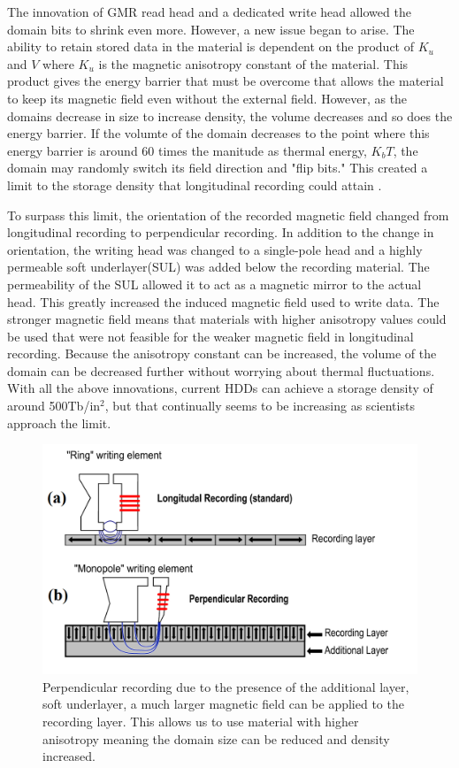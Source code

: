 \documentclass[ notitlepage, numerical, 11pt]{revtex4-1} %
\begin{document}
The innovation of GMR read head and a dedicated write head allowed the domain bits to shrink even more. However, a new issue began to arise. The ability to retain stored data in the material is dependent on the product of $K_u$ and $V$ where $K_u$ is the magnetic anisotropy constant of the material. This product gives the energy barrier that must be overcome that allows the material to keep its magnetic field even without the external field. However, as the domains decrease in size to increase density, the volume decreases and so does the energy barrier. If the volumte of the domain decreases to the point where this energy barrier is around 60 times the manitude as thermal energy, $K_bT$, the domain may randomly switch its field direction and "flip bits." This created a limit to the storage density that longitudinal recording could attain \cite{perpendicular}.

To surpass this limit, the orientation of the recorded magnetic field changed from longitudinal recording to perpendicular recording. In addition to the change in orientation, the writing head was changed to a single-pole head and a highly permeable soft underlayer(SUL) was added below the recording material. The permeability of the SUL allowed it to act as a magnetic mirror to the actual head. This greatly increased the induced magnetic field used to write data. The stronger magnetic field means that materials with higher anisotropy values could be used that were not feasible for the weaker magnetic field in longitudinal recording. Because the anisotropy constant can be increased, the volume of the domain can be decreased further without worrying about thermal fluctuations. With all the above innovations, current HDDs can achieve a storage density of around 500Tb/in$^2$, but that continually seems to be increasing as scientists approach the limit.

\begin{figure}[H]
\centerline{\includegraphics[scale=.45]{perpendicularComparison.png}}
\caption{Perpendicular recording due to the presence of the additional layer, soft underlayer, a much larger magnetic field can be applied to the recording layer. This allows us to use material with higher anisotropy meaning the domain size can be reduced and density increased.}
\label{perpendicularComparison}
\end{figure}
\end{document}
